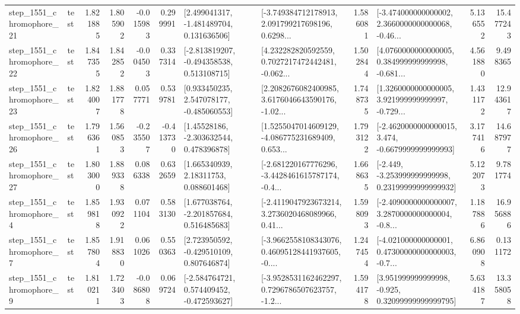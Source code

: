 \begin{tabular}{llrrrrllrlrr}
 step\_1551\_chromophore\_21 &      test &      1.821885 &    1.805902 &     -0.015983 &  0.299991 &    [2.499041317, -1.481489704, 0.131636506] &  [-3.749384712178913, 2.091799217698196, 0.6298... &       1.586081 &  [-3.474000000000002, 2.3660000000000068, -0.46... &            5.136552 &         15.477243 \\
 step\_1551\_chromophore\_22 &      test &      1.847355 &    1.842852 &     -0.004503 &  0.337314 &   [-2.813819207, -0.494358538, 0.513108715] &  [4.232282820592559, 0.7027217472442481, -0.062... &       1.502844 &  [4.0760000000000005, 0.384999999999998, -0.681... &            4.561880 &          9.498365 \\
 step\_1551\_chromophore\_23 &      test &      1.824007 &    1.881778 &      0.057771 &  0.539781 &    [0.933450235, 2.547078177, -0.485060553] &  [2.2082676082400985, 3.6176046643590176, -1.02... &       1.748735 &  [1.3260000000000005, 3.921999999999997, -0.729... &            1.431172 &         12.943617 \\
 step\_1551\_chromophore\_26 &      test &      1.796361 &    1.560853 &     -0.235507 & -0.413730 &     [1.45528186, -2.303632544, 0.478396878] &  [1.5255047014609129, -4.086775231689409, 0.653... &       1.793122 &  [-2.4620000000000015, 3.474, -0.6679999999999993] &            3.177416 &         14.687977 \\
 step\_1551\_chromophore\_27 &      test &      1.803000 &    1.889338 &      0.086338 &  0.632659 &      [1.665340939, 2.18311753, 0.088601468] &  [-2.681220167776296, -3.4428461615787174, -0.4... &       1.668635 &  [-2.449, -3.253999999999998, 0.23199999999999932] &            5.122073 &          9.781774 \\
  step\_1551\_chromophore\_4 &      test &      1.859818 &    1.930922 &      0.071104 &  0.583130 &    [1.677038764, -2.201857684, 0.516485683] &  [-2.4119047923673214, 3.2736020468089966, 0.41... &       1.598093 &  [-2.4090000000000007, 3.2870000000000004, -0.8... &            1.187886 &         16.956886 \\
  step\_1551\_chromophore\_7 &      test &      1.857804 &    1.918830 &      0.061026 &  0.550363 &    [2.723950592, -0.429510109, 0.807646874] &  [-3.9662558108343076, 0.46095128441937605, -0.... &       1.247454 &  [-4.021000000000001, 0.47300000000000003, -0.7... &            6.860908 &          0.131172 \\
  step\_1551\_chromophore\_9 &      test &      1.810211 &    1.723403 &     -0.086808 &  0.069724 &   [-2.584764721, 0.574409452, -0.472593627] &  [-3.9528531162462297, 0.7296786507623757, -1.2... &       1.594178 &   [3.951999999999998, -0.925, 0.32099999999999795] &            5.634187 &         13.358058 \\

\end{tabular}
